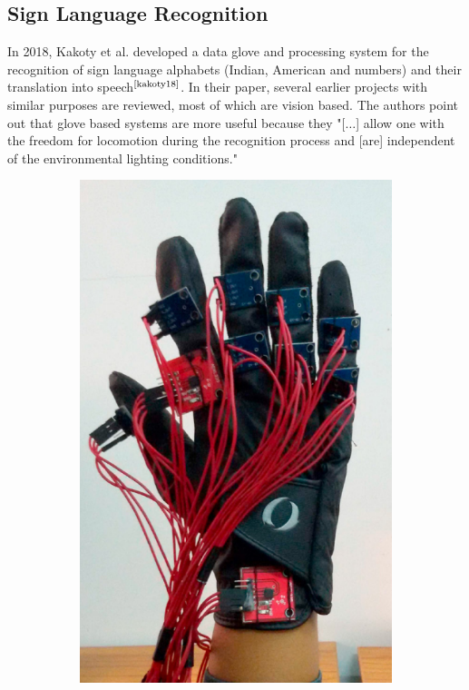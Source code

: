 \documentclass[hyperref, bachelorofscience]{cgvpub}
\newcommand{\newcite}[1]{$ ^{\text{\cite{#1}}} $}
\begin{document}
\subsection{Sign Language Recognition}
In 2018, Kakoty et al. developed a data glove and processing system for the recognition of sign language alphabets (Indian, American and numbers) and their translation into speech\newcite{kakoty18}. In their paper, several earlier projects with similar purposes are reviewed, most of which are vision based. The authors point out that glove based systems are more useful because they "[$\dots$] allow one with the freedom for locomotion during the recognition process and [are] independent of the environmental lighting conditions."

\begin{figure}
	\begin{subfigure}{.4\linewidth}
		\includegraphics[width=\linewidth]{../pics/kakoty_glove}

\end{subfigure}
\end{figure}
\end{document}
